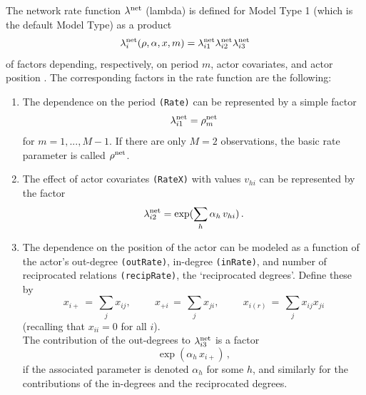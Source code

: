 \documentclass[a4paper,fleqn,11pt]{article}
\newcommand{\+}{\, + \,}
\begin{document}
The \hypertarget{T_rate}{network rate function} $\lambda^{\rm net}$
(lambda) is defined for Model Type 1 (which is the default Model
Type) as a product \[ \lambda^{\rm net}_i(\rho, \alpha, x, m) =
\lambda^{\rm net}_{i1} \lambda^{\rm net}_{i2} \lambda^{\rm net}_{i3}
\] of factors depending, respectively, on period $m$, actor
covariates, and actor position \citep[see][p.\ 383]{Snijders01}. The
corresponding factors in the rate function are the following:
\begin{enumerate}
 \item The dependence on the period \texttt{(Rate)}
 can be represented by a simple factor
 \[ \lambda^{\rm net}_{i1} = \rho^{\rm net}_m \]
 for $m = 1, ..., M-1$. If there are only $M = 2 $ observations,
 \hypertarget{T_rho}{the basic rate parameter} is called $ \rho^{\rm net}$.

 \item The effect of actor covariates \texttt{(RateX)} with values
 $v_{hi}$ can be represented by the factor
 \[ \lambda^{\rm net}_{i2} = \exp(\sum_h \alpha_h \, v_{hi})\,. \]

 \item The dependence on the position of the actor can be modeled
 as a function of the actor's out-degree \texttt{(outRate)},
 in-degree \texttt{(inRate)}, and number
 of reciprocated relations \texttt{(recipRate)}, the `reciprocated degrees'.
 Define these by
 \[ x_{i+} \,=\, \sum_j x_{ij}, \phantom{abcde} x_{+i} \,=\, \sum_j x_{ji},
                \phantom{abcde} x_{i(r)} \,=\, \sum_j x_{ij}x_{ji} \]
 (recalling that $x_{ii} = 0$ for all $i$).\\

The contribution of the out-degrees to $\lambda^{\rm net}_{i3}$
is a factor
 \[ \exp( \alpha_h \, x_{i+})\,, \]
if the associated parameter is denoted $\alpha_h$ for some $h$,
and similarly for the contributions of the in-degrees and the
reciprocated degrees.


\end{enumerate}
\end{document}
